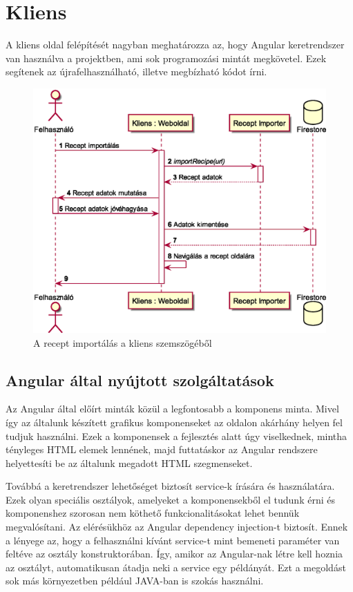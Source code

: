 \documentclass[12pt]{report}
\theoremstyle{definition}
\begin{document}
\section{Kliens}
A kliens oldal felépítését nagyban meghatározza az, hogy Angular keretrendszer van használva a projektben, ami sok programozási mintát megkövetel. Ezek segítenek az újrafelhasználható, illetve megbízható kódot írni.

\noindent
\begin{figure}[H]
	\centering
	\includegraphics[width=.8\textwidth]{out/diagrams/clientRecipeImport/clientRecipeImport.eps}
	\caption{A recept importálás a kliens szemszögéből}
    \label{fig:clientRecipeImport}
\end{figure}

\subsection{Angular által nyújtott szolgáltatások}
Az Angular által előírt minták közül a legfontosabb a komponens minta. Mivel így az általunk készített grafikus komponenseket az oldalon akárhány helyen fel tudjuk használni. Ezek a komponensek a fejlesztés alatt úgy viselkednek, mintha tényleges HTML elemek lennének, majd futtatáskor az Angular rendszere helyettesíti be az általunk megadott HTML szegmenseket.

Továbbá a keretrendszer lehetőséget biztosít service-k írására és használatára. Ezek olyan speciális osztályok, amelyeket a komponensekből el tudunk érni és komponenshez szorosan nem köthető funkcionalitásokat lehet bennük megvalósítani. Az elérésükhöz az Angular dependency injection-t biztosít. Ennek a lényege az, hogy a felhasználni kívánt service-t mint bemeneti paraméter van feltéve az osztály konstruktorában. Így, amikor az Angular-nak létre kell hoznia az osztályt, automatikusan átadja neki a service egy példányát.  Ezt a megoldást sok más környezetben például JAVA-ban is szokás használni.
\end{document}
